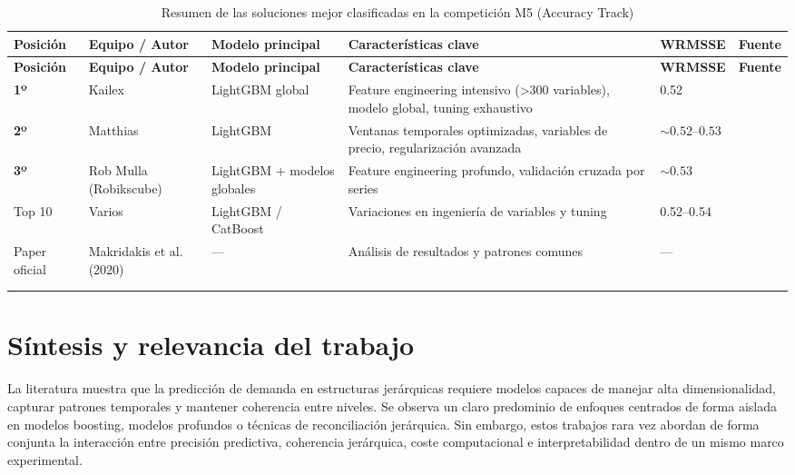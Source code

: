\documentclass[IB,BIB]{TFUOC}%
\begin{document}
\begin{longtable}{p{1.6cm} !{\vrule width 0.1pt} p{2.4cm} !{\vrule width 0.1pt} p{2.5cm} !{\vrule width 0.1pt} p{3.5cm} !{\vrule width 0.1pt} p{2.2cm} !{\vrule width 0.1pt} p{1.5cm}}

\toprule
\toprule
\textbf{Posición} & \textbf{Equipo / Autor} & \textbf{Modelo principal} & \textbf{Características clave} & \textbf{WRMSSE} & \textbf{Fuente} \\
\midrule
\midrule
\endfirsthead

\toprule
\toprule
\textbf{Posición} & \textbf{Equipo / Autor} & \textbf{Modelo principal} & \textbf{Características clave} & \textbf{WRMSSE} & \textbf{Fuente} \\
\midrule

\endhead

\textbf{1º} & Kailex & LightGBM global & Feature engineering intensivo (>300 variables), modelo global, tuning exhaustivo & 0.52 & \cite{kailex2020} \\
\midrule
\textbf{2º} & Matthias & LightGBM & Ventanas temporales optimizadas, variables de precio, regularización avanzada & $\sim 0.52$--$0.53$ & \cite{matthias2020} \\
\midrule
\textbf{3º} & Rob Mulla (Robikscube) & LightGBM + modelos globales & Feature engineering profundo, validación cruzada por series & $\sim 0.53$ & \cite{mulla2020} \\
\midrule
Top 10 & Varios & LightGBM / CatBoost & Variaciones en ingeniería de variables y tuning & 0.52--0.54 & \cite{m5competition2020} \\
\midrule
Paper oficial & Makridakis et al. (2020) & --- & Análisis de resultados y patrones comunes & --- & \cite{makridakis2021} \\
\bottomrule
\bottomrule

\\[-4pt]
\caption{Resumen de las soluciones mejor clasificadas en la competición M5 (Accuracy Track)} \\
\end{longtable}


\newpage
\section{Síntesis y relevancia del trabajo}

La literatura muestra que la predicción de demanda en estructuras
jerárquicas requiere modelos capaces de manejar alta dimensionalidad,
capturar patrones temporales y mantener coherencia entre niveles. 
Se observa un claro predominio de enfoques centrados de forma aislada en modelos boosting, modelos profundos o técnicas de reconciliación jerárquica. Sin embargo, estos trabajos rara vez abordan de forma conjunta la interacción entre precisión predictiva, coherencia jerárquica, coste computacional e interpretabilidad dentro de un mismo marco experimental.
\end{document}

